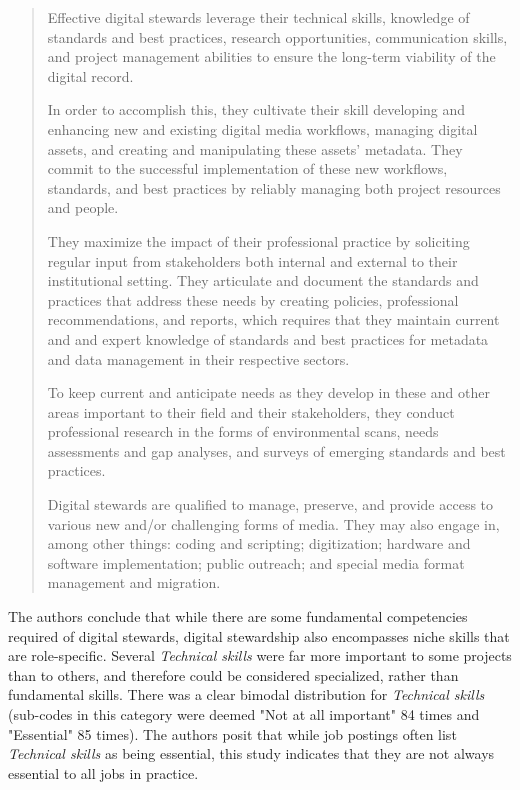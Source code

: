 \documentclass{acm_proc_article-sp}
\begin{document}
\begin{quote}
Effective digital stewards leverage their technical skills, knowledge of standards and best practices, research opportunities, communication skills, and project management abilities to ensure the long-term viability of the digital record.

In order to accomplish this, they cultivate their skill developing and enhancing new and existing digital media workflows, managing digital assets, and creating and manipulating these assets' metadata. They commit to the successful implementation of these new workflows, standards, and best practices by reliably managing both project resources and people.

They maximize the impact of their professional practice by soliciting regular input from stakeholders both internal and external to their institutional setting. They articulate and document the standards and practices that address these needs by creating policies, professional recommendations, and reports, which requires that they maintain current and and expert knowledge of standards and best practices for metadata and data management in their respective sectors.

To keep current and anticipate needs as they develop in these and other areas important to their field and their stakeholders, they conduct professional research in the forms of environmental scans, needs assessments and gap analyses, and surveys of emerging standards and best practices.

Digital stewards are qualified to manage, preserve, and provide access to various new and/or challenging forms of media. They may also engage in, among other things: coding and scripting; digitization; hardware and software implementation; public outreach; and special media format management and migration.
\end{quote}

The authors conclude that while there are some fundamental competencies required of digital stewards, digital stewardship also encompasses niche skills that are role-specific. Several \textit{Technical skills} were far more important to some projects than to others, and therefore could be considered specialized, rather than fundamental skills. There was a clear bimodal distribution for \textit{Technical skills} (sub-codes in this category were deemed "Not at all important" 84 times and "Essential" 85 times). The authors posit that while job postings often list \textit{Technical skills} as being essential, this study indicates that they are not always essential to all jobs in practice. 
\end{document}
